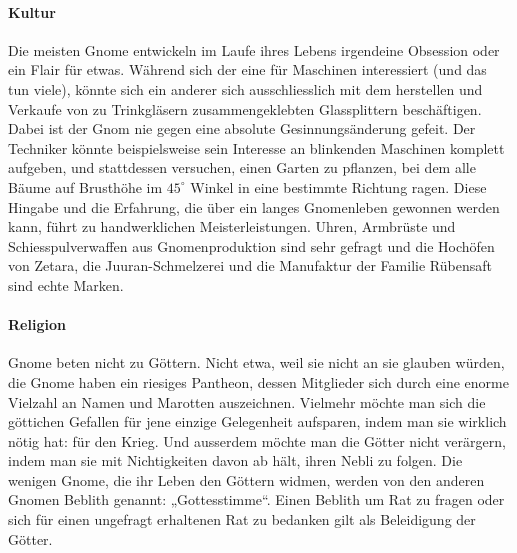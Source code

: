 \documentclass[12pt,twoside,twocolumn,openany]{book}
\begin{document}
\paragraph{Kultur}
Die meisten Gnome entwickeln im Laufe ihres Lebens irgendeine Obsession oder ein Flair für etwas. Während sich der eine für Maschinen interessiert (und das tun viele), könnte sich ein anderer sich ausschliesslich mit dem herstellen und Verkaufe von zu Trinkgläsern zusammengeklebten Glassplittern beschäftigen. Dabei ist der Gnom nie gegen eine absolute Gesinnungsänderung gefeit. Der Techniker könnte beispielsweise sein Interesse an blinkenden Maschinen komplett aufgeben, und stattdessen versuchen, einen Garten zu pflanzen, bei dem alle Bäume auf Brusthöhe im $45^{\circ}$ Winkel in eine bestimmte Richtung ragen. Diese Hingabe und die Erfahrung, die über ein langes Gnomenleben gewonnen werden kann,  führt zu handwerklichen Meisterleistungen. Uhren, Armbrüste und Schiesspulverwaffen aus Gnomenproduktion sind sehr gefragt und die  Hochöfen von Zetara, die Juuran-Schmelzerei und die Manufaktur der Familie Rübensaft sind echte Marken.



\paragraph{Religion}
Gnome beten nicht zu Göttern. Nicht etwa, weil sie nicht an sie glauben würden, die Gnome haben ein riesiges Pantheon, dessen Mitglieder sich durch eine enorme Vielzahl an Namen und Marotten auszeichnen.  Vielmehr möchte man sich die göttichen Gefallen für jene einzige Gelegenheit aufsparen, indem man sie wirklich nötig hat: für den Krieg. Und ausserdem möchte man die Götter nicht verärgern, indem man sie mit Nichtigkeiten davon ab hält, ihren Nebli zu folgen. Die wenigen Gnome, die ihr Leben den Göttern widmen,  werden von den anderen Gnomen Beblith genannt: „Gottesstimme“.  Einen Beblith um Rat zu fragen oder sich für einen ungefragt erhaltenen Rat zu bedanken gilt als Beleidigung der Götter.
\end{document}
